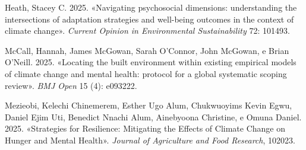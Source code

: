 \documentclass[
]{article}
\newlength{\cslhangindent}
\newenvironment{CSLReferences}[2] %
 {\begin{list}{}{%
  \setlength{\itemindent}{0pt}
  \setlength{\leftmargin}{0pt}
  \setlength{\parsep}{0pt}
  \ifodd #1
   \setlength{\leftmargin}{\cslhangindent}
   \setlength{\itemindent}{-1\cslhangindent}
  \fi
  \setlength{\itemsep}{#2\baselineskip}}}
 {\end{list}}
\begin{document}
\label{refs}
\begin{CSLReferences}{1}{0}
Heath, Stacey C. 2025. {«Navigating psychosocial dimensions:
understanding the intersections of adaptation strategies and well-being
outcomes in the context of climate change»}. \emph{Current Opinion in
Environmental Sustainability} 72: 101493.

McCall, Hannah, James McGowan, Sarah O'Connor, John McGowan, e Brian
O'Neill. 2025. {«Locating the built environment within existing
empirical models of climate change and mental health: protocol for a
global systematic scoping review»}. \emph{BMJ Open} 15 (4): e093222.

Mezieobi, Kelechi Chinemerem, Esther Ugo Alum, Chukwuoyims Kevin Egwu,
Daniel Ejim Uti, Benedict Nnachi Alum, Ainebyoona Christine, e Omuna
Daniel. 2025. {«Strategies for Resilience: Mitigating the Effects of
Climate Change on Hunger and Mental Health»}. \emph{Journal of
Agriculture and Food Research}, 102023.

\end{CSLReferences}
\end{document}

